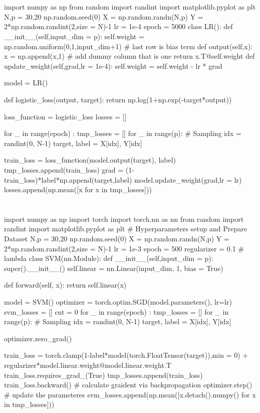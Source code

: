 \documentclass[10pt]{article}
\begin{document}
\section{}
\begin{python}
import numpy as np
from random import randint
import matplotlib.pyplot as plt
N,p = 30,20
np.random.seed(0)
X = np.random.randn(N,p)
Y = 2*np.random.randint(2,size = N)-1
lr = 1e-4
epoch = 5000
class LR():
    def __init__(self,input_dim = p):
        self.weight = np.random.uniform(0,1,input_dim+1) # last row is bias term
    def output(self,x):
        x = np.append(x,1) # add dummy column that is one
        return x.T@self.weight
    def update_weight(self,grad,lr = 1e-4):
        self.weight = self.weight - lr * grad

model = LR()

def logistic_loss(output, target):
    return np.log(1+np.exp(-target*output))

loss_function = logistic_loss                                                   
losses = []

for _ in range(epoch) :
    tmp_losses = []
    for _ in range(p):
        # Sampling
        idx = randint(0, N-1)
        target, label = X[idx], Y[idx]
        
        train_loss = loss_function(model.output(target), label)
        tmp_losses.append(train_loss)
        grad = (1-train_loss)*label*np.append(target,label)
        model.update_weight(grad,lr = lr)
    losses.append(np.mean([x for x in tmp_losses]))
\end{python}
\section{}
\begin{python}
import numpy as np
import torch
import torch.nn as nn
from random import randint
import matplotlib.pyplot as plt
# Hyperparameters setup and Prepare Dataset
N,p = 30,20
np.random.seed(0)
X = np.random.randn(N,p)
Y = 2*np.random.randint(2,size = N)-1
lr = 1e-3
epoch = 500
regularizer = 0.1 # lambda
class SVM(nn.Module):
    def __init__(self,input_dim = p):
        super().__init__()
        self.linear = nn.Linear(input_dim, 1, bias = True)
    
    def forward(self, x):
        return self.linear(x)

model = SVM()
optimizer = torch.optim.SGD(model.parameters(), lr=lr) 
svm_losses = []
cnt = 0
for _ in range(epoch) :
    tmp_losses = []
    for _ in range(p):
        # Sampling
        idx = randint(0, N-1)
        target, label = X[idx], Y[idx]

        optimizer.zero_grad()
        
        train_loss = torch.clamp(1-label*model(torch.FloatTensor(target)),min = 0) + regularizer*model.linear.weight@model.linear.weight.T
        train_loss.requires_grad_(True)
        tmp_losses.append(train_loss)
        train_loss.backward() # calculate graident via backpropagation
        optimizer.step() # update the parameteres
    svm_losses.append(np.mean([x.detach().numpy() for x in tmp_losses]))
\end{python}
\end{document}
